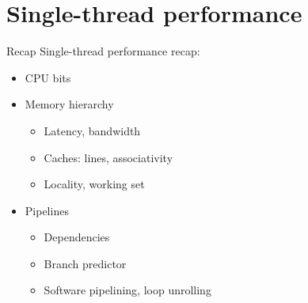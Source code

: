 \documentclass[english,compress]{beamer}
\begin{document}
\section{Single-thread performance}
\begin{frame}{Recap}
  Single-thread performance recap:
  \begin{itemize}
    \item CPU bits
    \item Memory hierarchy
      \begin{itemize}
        \item Latency, bandwidth
        \item Caches: lines, associativity
        \item Locality, working set
      \end{itemize}
    \item Pipelines
      \begin{itemize}
        \item Dependencies
        \item Branch predictor
        \item Software pipelining, loop unrolling
      \end{itemize}
  \end{itemize}
\end{frame}
\end{document}
